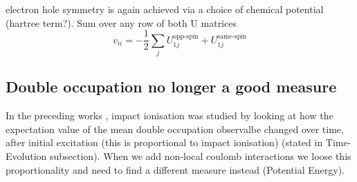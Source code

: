 electron hole symmetry is again achieved via a choice of chemical potential (hartree term?). Sum over any row of both U matrices
\begin{equation}
    v_{ii} = - \frac{1}{2}\sum_{j} U_{1j}^{\text{opp-spin}} + U_{1j}^{\text{same-spin}}
\end{equation}

\subsection{Double occupation no longer a good measure}
In the preceding works \cite{innerberger,worm_bachelor,worm_project,prauhart}, impact ionisation was studied by looking at how the expectation value of the mean double occupation observalbe changed over time, after initial excitation (this is proportional to impact ionisation) (stated in Time-Evolution subsection). When we add non-local coulomb interactions we loose this proportionality and need to find a different measure instead (Potential Energy).